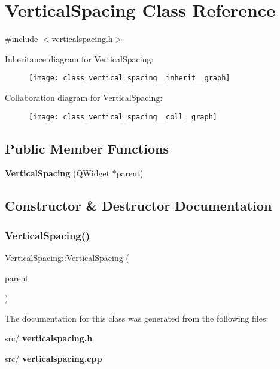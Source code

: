 \section{Vertical\+Spacing Class Reference}
\label{class_vertical_spacing}


{\ttfamily \#include $<$verticalspacing.\+h$>$}



Inheritance diagram for Vertical\+Spacing\+:\nopagebreak
\begin{figure}[H]
\begin{center}
\leavevmode
\texttt{[image: class\_vertical\_spacing\_\_inherit\_\_graph]}
\end{center}
\end{figure}


Collaboration diagram for Vertical\+Spacing\+:\nopagebreak
\begin{figure}[H]
\begin{center}
\leavevmode
\texttt{[image: class\_vertical\_spacing\_\_coll\_\_graph]}
\end{center}
\end{figure}
\subsection*{Public Member Functions}
\begin{DoxyCompactItemize}
\item 
\textbf{ Vertical\+Spacing} (Q\+Widget $\ast$parent)
\end{DoxyCompactItemize}


\subsection{Constructor \& Destructor Documentation}
\mbox{\label{class_vertical_spacing_a5b13e0e5688f7abc6ffb19f9b2c5e9a0}} 
\subsubsection{Vertical\+Spacing()}
{\footnotesize\ttfamily Vertical\+Spacing\+::\+Vertical\+Spacing (\begin{DoxyParamCaption}\item[{Q\+Widget $\ast$}]{parent }\end{DoxyParamCaption})}



The documentation for this class was generated from the following files\+:\begin{DoxyCompactItemize}
\item 
src/\textbf{ verticalspacing.\+h}\item 
src/\textbf{ verticalspacing.\+cpp}\end{DoxyCompactItemize}
